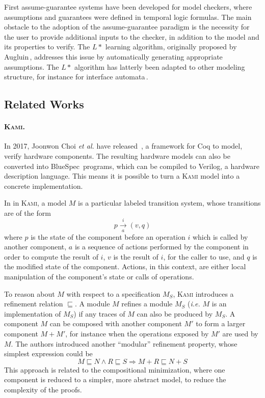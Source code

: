 First assume-guarantee systems have been developed for model checkers, where
assumptions and guarantees were defined in temporal logic formulas.
%
The main obstacle to the adoption of the assume-guarantee paradigm is the
necessity for the user to provide additional inputs to the checker, in addition
to the model and its properties to verify.
%
The \( L* \) learning algorithm, originally proposed by
Augluin\,\cite{angluin1987lstart}, addresses this issue by automatically
generating appropriate assumptions.
%
The \( L* \) algorithm has latterly been adapted to other modeling structure, for
instance for interface automata\,\cite{emmi2008assume}.

\subsection{Related Works}

\paragraph{{\scshape Kami}.}
%
In 2017, Joonwon Choi \emph{et al.} have released \,\cite{choi2017kami}, a
framework for Coq to model, verify hardware components.
%
The resulting hardware models can also be converted into
BlueSpec\,\cite{nikhil2004bluespec} programs, which can be compiled to Verilog,
a hardware description language.
%
This means it is possible to turn a {\scshape Kami} model into a concrete
implementation.

In in {\scshape Kami}, a model \( M \) is a particular labeled transition
system, whose transitions are of the form
%
\[
  p \xrightarrow[a]{i} (v, q)
\]
%
where \( p \) is the state of the component before an operation \( i \) which is
called by another component, \( a \) is a sequence of actions performed by the
component in order to compute the result of \( i \), \( v \) is the result of
\( i \), for the caller to use, and \( q \) is the modified state of the
component.
%
Actions, in this context, are either local manipulation of the component's
state or calls of operations.

To reason about \( M \) with respect to a specification \( M_S \), {\scshape
  Kami} introduces a refinement relation \( \sqsubseteq \).
%
A module \( M \) refines a module \( M_S \) (\emph{i.e.} \( M \) is an
implementation of \( M_S \)) if any traces of \( M \) can also be produced by
\( M_S \).
%
A component \( M \) can be composed with another component \( M' \) to form a
larger component \( M + M' \), for instance when the operations exposed by
\( M' \) are used by \( M \).
%
The authors introduced another ``modular'' refinement property, whose simplest
expression could be
%
\[
  M \sqsubseteq N \wedge R \sqsubseteq S \Rightarrow M + R \sqsubseteq N + S
\]
%
This approach is related to the compositional minimization, where one component
is reduced to a simpler, more abstract model, to reduce the complexity of the
proofs.

